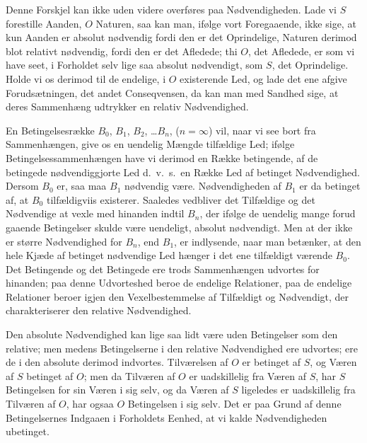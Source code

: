 \documentclass[12pt]{book}
\newcommand{\apage}[1]{\marginnote{\footnotesize\textit{[#1]}}}
\begin{document}
Denne Forskjel kan ikke uden videre overføres paa Nødvendigheden. Lade vi
$S$ forestille Aanden, $O$ Naturen, saa kan man, ifølge vort Foregaaende,
ikke \apage{224} sige, at kun Aanden er absolut nødvendig fordi den er det Oprindelige,
Naturen derimod blot relativt nødvendig, fordi den er det Afledede; thi $O$,
det Afledede, er som vi have seet, i Forholdet selv lige saa absolut
nødvendigt, som $S$, det Oprindelige. Holde vi os derimod til de endelige, i
$O$ existerende Led, og lade det ene afgive Forudsætningen, det andet
Conseqvensen, da kan man med Sandhed sige, at deres Sammenhæng udtrykker en
relativ Nødvendighed.

En Betingelsesrække $B_0$, $B_1$, $B_2$, \ldots $B_n$, ($n = \infty$) vil,
naar vi see bort fra Sammenhængen, give os en uendelig Mængde tilfældige
Led; ifølge Betingelsessammenhængen have vi derimod en Række betingende, af
de betingede nødvendiggjorte Led d.\ v.\ s.\ en Række Led af betinget
Nødvendighed. Dersom $B_0$ er, saa maa $B_1$ nødvendig være. Nødvendigheden
af $B_1$ er da betinget af, at $B_0$ tilfældigviis existerer. Saaledes
vedbliver det Tilfældige og det Nødvendige at vexle med hinanden indtil
$B_n$, der ifølge de uendelig mange forud gaaende Betingelser skulde være
uendeligt, absolut nødvendigt. Men at der ikke er større Nødvendighed for
$B_n$, end $B_1$, er indlysende, naar man betænker, at den hele Kjæde af
betinget nødvendige Led hænger i det ene tilfældigt værende $B_0$. Det
Betingende og det Betingede ere trods Sammenhængen udvortes for hinanden;
paa denne Udvorteshed beroe de endelige Relationer, paa de endelige
Relationer beroer igjen den Vexelbestemmelse af Tilfældigt og Nødvendigt,
der charakteriserer den relative Nødvendighed.

\apage{225} Den absolute Nødvendighed kan lige saa lidt være uden Betingelser som den
relative; men medens Betingelserne i den relative Nødvendighed ere udvortes;
ere de i den absolute derimod indvortes. Tilværelsen af $O$ er betinget af
$S$, og Væren af $S$ betinget af $O$; men da Tilværen af $O$ er uadskillelig
fra Væren af $S$, har $S$ Betingelsen for sin Væren i sig selv, og da Væren
af $S$ ligeledes er uadskillelig fra Tilværen af $O$, har ogsaa $O$
Betingelsen i sig selv. Det er paa Grund af denne Betingelsernes Indgaaen i
Forholdets Eenhed, at vi kalde Nødvendigheden ubetinget.
\end{document}
